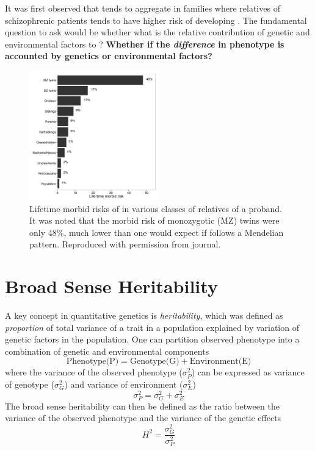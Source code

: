 \documentclass{book}
\newcommand*{\glng}{\glsentrylong}
\begin{document}
	It was first observed that \glng{scz} tends to aggregate in families where relatives of schizophrenic patients tends to have higher risk of developing \glng{scz}\citep{gottesman1991schizophrenia}. %
	The fundamental question to ask would be whether what is the relative contribution of genetic and environmental factors to \glng{scz}?
	\textbf{Whether if the \emph{difference} in phenotype is accounted by genetics or environmental factors?}
	\begin{figure}
		\centering
		\includegraphics[width=0.5\textwidth]{figure/lifeTimeMorbidRisk.png}
		\caption[Lifetime morbid risks of \glng{scz} in various classes of relatives of a proband]{Lifetime morbid risks of \glng{scz} in various classes of relatives of a proband.
			It was noted that the morbid risk of monozygotic (MZ) twins were only $48\%$, much lower than one would expect if \glng{scz} follows a Mendelian pattern.
			Reproduced with permission from journal\citep{Riley2006}. \label{fig:lifeMRscz}}
		
	\end{figure}
	
	\section{Broad Sense Heritability}

	A key concept in quantitative genetics is \emph{heritability}, which was defined as \emph{proportion} of total variance of a trait in a population explained by variation of genetic factors in the population.
	One can partition observed phenotype into a combination of genetic and environmental components\citep{Falconer1996}
	$$
	\text{Phenotype(P)}=\text{Genotype(G)}+\text{Environment(E)}
	$$
	where the variance of the observed phenotype ($\sigma_P^2$) can be expressed as variance of genotype ($\sigma_G^2$) and variance of environment ($\sigma_E^2$)
	$$
		\sigma_P^2=\sigma_G^2+\sigma_E^2
	$$
	The broad sense heritability can then be defined as the ratio between the variance of the observed phenotype and the variance of the genetic effects
	$$
	H^2=\frac{\sigma_G^2}{\sigma_P^2}
	$$
	
\end{document}
